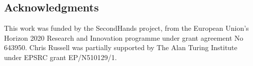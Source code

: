 \documentclass[10pt,twocolumn,letterpaper]{article}
\begin{document}
\subsection*{Acknowledgments}
This work was funded by the SecondHands project, from
the European Union's Horizon 2020 Research and Innovation programme
under grant agreement No 643950.   Chris Russell was partially
supported by The Alan Turing Institute under  EPSRC grant
EP/N510129/1.

{\small
    }



\end{document}
